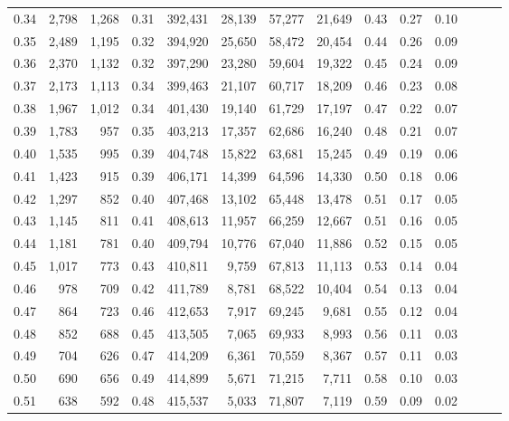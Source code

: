 \begin{tabular}{rrrrrrrrrrrrrr}
0.34 &   2,798 &  1,268 &  0.31 &  392,431 &   28,139 &  57,277 &  21,649 &  0.43 &  0.27 &      0.10 \\
0.35 &   2,489 &  1,195 &  0.32 &  394,920 &   25,650 &  58,472 &  20,454 &  0.44 &  0.26 &      0.09 \\
0.36 &   2,370 &  1,132 &  0.32 &  397,290 &   23,280 &  59,604 &  19,322 &  0.45 &  0.24 &      0.09 \\
0.37 &   2,173 &  1,113 &  0.34 &  399,463 &   21,107 &  60,717 &  18,209 &  0.46 &  0.23 &      0.08 \\
0.38 &   1,967 &  1,012 &  0.34 &  401,430 &   19,140 &  61,729 &  17,197 &  0.47 &  0.22 &      0.07 \\
0.39 &   1,783 &    957 &  0.35 &  403,213 &   17,357 &  62,686 &  16,240 &  0.48 &  0.21 &      0.07 \\
0.40 &   1,535 &    995 &  0.39 &  404,748 &   15,822 &  63,681 &  15,245 &  0.49 &  0.19 &      0.06 \\
0.41 &   1,423 &    915 &  0.39 &  406,171 &   14,399 &  64,596 &  14,330 &  0.50 &  0.18 &      0.06 \\
0.42 &   1,297 &    852 &  0.40 &  407,468 &   13,102 &  65,448 &  13,478 &  0.51 &  0.17 &      0.05 \\
0.43 &   1,145 &    811 &  0.41 &  408,613 &   11,957 &  66,259 &  12,667 &  0.51 &  0.16 &      0.05 \\
0.44 &   1,181 &    781 &  0.40 &  409,794 &   10,776 &  67,040 &  11,886 &  0.52 &  0.15 &      0.05 \\
0.45 &   1,017 &    773 &  0.43 &  410,811 &    9,759 &  67,813 &  11,113 &  0.53 &  0.14 &      0.04 \\
0.46 &     978 &    709 &  0.42 &  411,789 &    8,781 &  68,522 &  10,404 &  0.54 &  0.13 &      0.04 \\
0.47 &     864 &    723 &  0.46 &  412,653 &    7,917 &  69,245 &   9,681 &  0.55 &  0.12 &      0.04 \\
0.48 &     852 &    688 &  0.45 &  413,505 &    7,065 &  69,933 &   8,993 &  0.56 &  0.11 &      0.03 \\
0.49 &     704 &    626 &  0.47 &  414,209 &    6,361 &  70,559 &   8,367 &  0.57 &  0.11 &      0.03 \\
0.50 &     690 &    656 &  0.49 &  414,899 &    5,671 &  71,215 &   7,711 &  0.58 &  0.10 &      0.03 \\
0.51 &     638 &    592 &  0.48 &  415,537 &    5,033 &  71,807 &   7,119 &  0.59 &  0.09 &      0.02 \\

\end{tabular}
